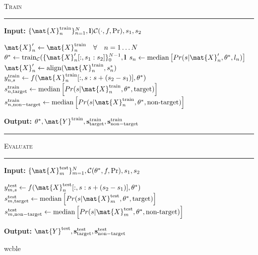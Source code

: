 \begin{algorithm}[H]
	\textsc{Train}
	\smallskip \hrule \smallskip
	\textbf{Input:} $\{\mat{X}_n^\mathrm{train}\}_{n=1}^N, \mathbf{l})
		\mathcal{C}(\cdot,f,\Pr), s_1, s_2$
	\begin{algorithmic}[1]
		\State $\mat{X}'_n \gets \mat{X}^\mathrm{train}_n \quad \forall \quad n=1\ldots
    N$
		\Repeat
		\State $\theta^* \gets \mathrm{train}_\mathcal{C}(\{\mat{X}'_n[:,s_1:s_2]\}_0^{N-1},\mathbf{l}$
    \State  $s_n \gets
			    \mathrm{median}\left[Pr(s|\mat{X}_n',\theta^*,l_n)\right]$
		\State $\mat{X}'_n \gets \mathrm{align}(\mat{X}^\mathrm{train}_n, s^*_n)$
		\EndFor
      \State $y_{n,s}^\mathrm{train} \gets
      f(\mat{X}_n^\mathrm{train}[:,s:s+(s_2-s_1)],\theta^*)$
        \EndFor
        \State $s_{n,\mathrm{target}}^\mathrm{train} \gets
			    \mathrm{median}\left[Pr(s|\mat{X}_n^\mathrm{train},\theta^*,\mathrm{target})\right]$
		    \State $s_{n,\mathrm{non-target}}^\mathrm{train}\gets
			    \mathrm{median}\left[Pr(s|\mat{X}_n^\mathrm{train},\theta^*,\textrm{non-target})\right]$
    \EndFor

	\end{algorithmic}
	\textbf{Output:} $\theta^*,
  \mat{Y}^\mathrm{train},
  \mathbf{s}_\mathrm{target}^\mathrm{train},
  \mathbf{s}_\mathrm{non-target}^\mathrm{train}$

	\smallskip \hrule \smallskip
	\textsc{Evaluate}
	\smallskip \hrule \smallskip
	\textbf{Input:} $\{\mat{X}_m^\mathrm{test}\}_{m=1}^N, \mathcal{C}(\theta^*,f, \Pr), s_1, s_2$
  \begin{algorithmic}[1]
      \State $y_{m,s}^\mathrm{test} \gets
      f(\mat{X}_n^\mathrm{test}[:,s:s+(s_2-s_1)],\theta^*)$
        \EndFor
        \State $s_{m,\mathrm{target}}^\mathrm{test} \gets
			    \mathrm{median}\left[Pr(s|\mat{X}_m^\mathrm{test},\theta^*,\mathrm{target})\right]$
		    \State $s_{m,\mathrm{non-target}}^\mathrm{test}\gets
			    \mathrm{median}\left[Pr(s|\mat{X}_m^\mathrm{test},\theta^*,\textrm{non-target})\right]$
    \EndFor
	\end{algorithmic}
  \textbf{Output:} $\mat{Y}^\mathrm{test},
  \mathbf{s}_\mathrm{target}^\mathrm{test},
  \mathbf{s}_\mathrm{non-target}^\mathrm{test}$
  \caption{\ac{wcble}}
	\label{alg:wcble}
\end{algorithm}

